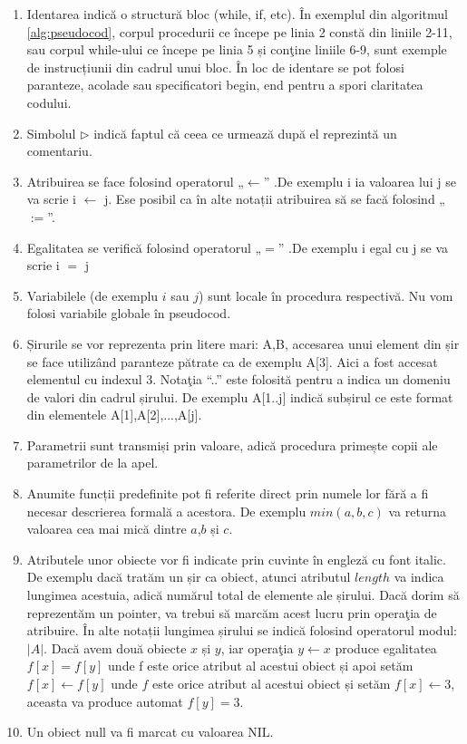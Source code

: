 \begin{enumerate}
\item {
	Identarea indică o structură bloc (while, if, etc). În exemplul din algoritmul \ref{alg:pseudocod}, corpul procedurii ce
	începe pe linia 2 constă din liniile 2-11, sau corpul while-ului ce începe pe linia 5 și conţine
	liniile 6-9, sunt exemple de instrucțiunii din cadrul unui bloc.
	În loc de identare se pot folosi paranteze, acolade sau specificatori begin, end pentru a spori claritatea codului.
}
\item {
	Simbolul $\rhd$ indică faptul că ceea ce urmează după el reprezintă un comentariu.
}
\item {
	Atribuirea se face folosind operatorul „$\leftarrow$” .De exemplu i ia valoarea lui j se va scrie i $\leftarrow$ j. Ese posibil ca în alte notații atribuirea să se facă folosind „$:=$”.
}
\item {
	Egalitatea se verifică folosind operatorul „$=$” .De exemplu i egal cu j se va scrie i $=$ j
}
\item {
	Variabilele (de exemplu $i$ sau $j$) sunt locale în procedura respectivă. Nu vom folosi variabile globale în pseudocod.
}
\item {
	Șirurile se vor reprezenta prin litere mari: A,B, accesarea unui element din șir se face utilizând paranteze pătrate ca de exemplu A[3]. Aici a fost accesat elementul cu indexul 3. Notaţia “..” este folosită pentru a indica un domeniu de valori din cadrul șirului. De exemplu A[1..j] indică subșirul ce este format din elementele A[1],A[2],...,A[j].	
}
\item {
	Parametrii sunt transmiși prin valoare, adică procedura primește copii ale parametrilor de la apel.
}
\item {
	Anumite funcții predefinite pot fi referite direct prin numele lor fără a fi necesar descrierea formală a acestora. De exemplu $min(a,b,c)$ va returna valoarea cea mai mică dintre $a$,$b$ și $c$.
}
\item {
	Atributele unor obiecte vor fi indicate prin cuvinte în engleză cu font italic. De exemplu dacă tratăm un șir ca obiect, atunci atributul $length$ va indica lungimea acestuia, adică numărul total de elemente ale șirului. Dacă dorim să reprezentăm un pointer, va trebui să marcăm acest lucru prin operaţia de atribuire. În alte notații lungimea șirului se indică folosind operatorul modul: $|A|$.
	Dacă avem două obiecte $x$ și $y$, iar operaţia $y  \leftarrow x$ produce egalitatea $f[x]=f[y]$ unde f este orice atribut al acestui obiect și apoi setăm $f[x] \leftarrow f[y]$ unde $f$ este orice atribut al acestui obiect și setăm $f[x] \leftarrow 3$, aceasta va produce automat $f[y]=3$.	
}
\item {
	Un obiect null va fi marcat cu valoarea NIL.
}

\end{enumerate}

